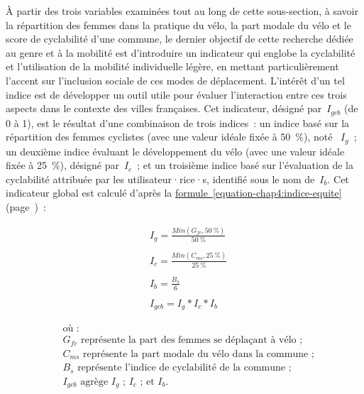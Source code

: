 \begin{refsegment}
À partir des trois variables examinées tout au long de cette sous-section, à savoir la répartition des femmes dans la pratique du vélo, la part modale du vélo et le score de cyclabilité d'une commune, le dernier objectif de cette recherche dédiée au genre et à la mobilité est d'introduire un indicateur qui englobe la cyclabilité et l'utilisation de la mobilité individuelle légère, en mettant particulièrement l'accent sur l'inclusion sociale de ces modes de déplacement. L'intérêt d'un tel indice est de développer un outil utile pour évaluer l'interaction entre ces trois aspects dans le contexte des villes françaises. Cet indicateur, désigné par~\(I_{gcb}\) (de 0 à 1), est le résultat d'une combinaison de trois indices~: un indice basé sur la répartition des femmes cyclistes (avec une valeur idéale fixée à 50~\%), noté ~\(I_{g}\)~; un deuxième indice évaluant le développement du vélo (avec une valeur idéale fixée à 25~\%), désigné par~\(I_{c}\)~; et un troisième indice basé sur l'évaluation de la cyclabilité attribuée par les utilisateur·rice·s, identifié sous le nom de~\(I_{b}\). Cet indicateur global est calculé d'après la \hyperref[equation-chap4:indice-equite]{formule~\ref{equation-chap4:indice-equite}} (page~\pageref{equation-chap4:indice-equite})~:%

    \begin{equation}
    \label{equation-chap4:indice-equite}
    \begin{aligned}
&I_{g} = \frac{Min(G_{fc}, 50~\%)}{50~\%}
    \\\\
&I_{c} = \frac{Min(C_{ms}, 25~\%)}{25~\%}
    \\\\
&I_{b} = \frac{B_{s}}{6}
    \\\\
&I_{gcb} = I_{g} * I_{c} * I_{b}
    \end{aligned}
    \end{equation}

    \begin{align*}
        &\text{où~:} \\
&G_{fc} \text{ représente la part des femmes se déplaçant à vélo~;} \\
&C_{ms} \text{ représente la part modale du vélo dans la commune~;} \\
&B_{s} \text{ représente l'indice de cyclabilité de la commune~;} \\
&I_{gcb} \text{ agrège }I_{g}\text{ ; }I_{c}\text{ ; et }I_{b}\text{.}
    \end{align*}


\end{refsegment}

